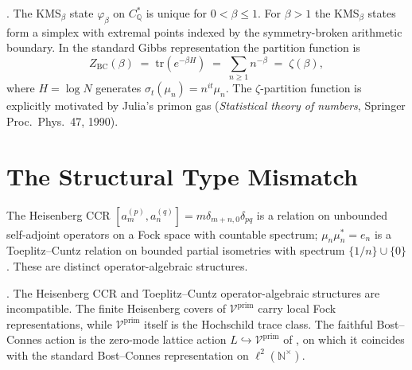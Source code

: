 \begin{theorem}
\label{v4-arith:thm:BC-KMS}
\ClaimStatusProvedElsewhere. The KMS\({}_{\beta}\) state \(\varphi_{\beta}\)
on \(C_{\mathbb{Q}}^{*}\) is unique for \(0<\beta\leq1\). For
\(\beta>1\) the KMS\({}_{\beta}\) states form a simplex with extremal
points indexed by the symmetry-broken arithmetic boundary. In the
standard Gibbs representation the partition function is
\begin{equation}
Z_{\mathrm{BC}}(\beta)\;=\;\mathrm{tr}(e^{-\beta H})\;=\;\sum_{n\geq 1}n^{-\beta}\;=\;\zeta(\beta),
\end{equation}
where \(H=\log N\) generates \(\sigma_{t}(\mu_{n})=n^{it}\mu_{n}\). The
\(\zeta\)-partition function is explicitly motivated by Julia's
primon gas (\emph{Statistical theory of numbers}, Springer
Proc.~Phys.~47, 1990).
\end{theorem}

\section{The Structural Type Mismatch}
\label{v4-arith:cs:type-mismatch}

\begin{observation}
\label{v4-arith:obs:CCR-vs-Cuntz-Toeplitz}
The Heisenberg CCR \([a_{m}^{(p)},a_{n}^{(q)}]=m\delta_{m+n,0}\delta_{pq}\)
is a relation on unbounded self-adjoint operators on a Fock space
with countable spectrum; \(\mu_{n}\mu_{n}^{*}=e_{n}\) is a
Toeplitz--Cuntz relation on bounded partial isometries with
spectrum \(\{1/n\}\cup\{0\}\). These are distinct operator-algebraic
structures.
\end{observation}

\begin{corollary}
\label{v4-arith:cor:fock-projections-determine-rep}
\ClaimStatusProvedHere. The Heisenberg CCR and Toeplitz--Cuntz
operator-algebraic structures are incompatible. The finite
Heisenberg covers of \(\mathcal{V}^{\mathrm{prim}}\) carry local Fock
representations, while \(\mathcal{V}^{\mathrm{prim}}\) itself is the
Hochschild trace class. The faithful Bost--Connes action is the
zero-mode lattice action
\(L \hookrightarrow \mathcal{V}^{\mathrm{prim}}\) of
, on which it coincides with the
standard Bost--Connes representation on \(\ell^{2}(\mathbb{N}^{\times})\).
\end{corollary}

